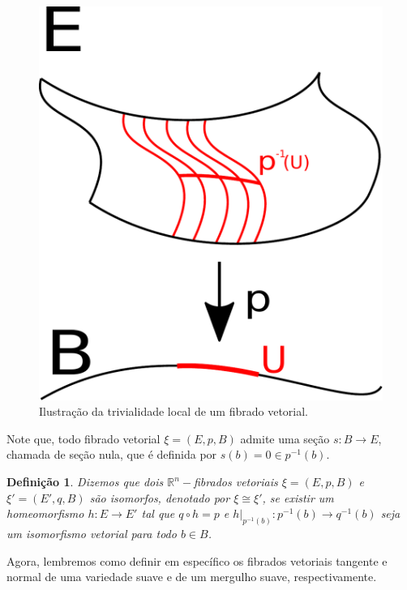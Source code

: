 \documentclass[12pt,oneside]{book} %
\newtheorem{defi}   {\hspace{0.5cm}Defini\c c\~ao}[chapter]
\newcommand{\R}{\mathbb{R}}
\begin{document}
\begin{figure}[h]
	\centering
	\includegraphics[scale=0.3]{fibrado.pdf}
	\caption{Ilustração da trivialidade local de um fibrado vetorial.}
\end{figure}

\par Note que, todo fibrado vetorial $\xi=(E,p,B)$ admite uma seção $s:B\to E$, chamada de seção nula, que é definida por $s(b)=0\in p^{-1}(b)$.

\begin{defi}\label{fv_iso}
	Dizemos que dois $\R^{n}-$fibrados vetoriais $\xi=(E,p,B)$ e $\xi'=(E',q,B)$ são isomorfos, denotado por $\xi\cong\xi'$, se existir um homeomorfismo $h:E\to E'$ tal que $q\circ h=p$ e $h|_{p^{-1}(b)}:p^{-1}(b)\to q^{-1}(b)$ seja um isomorfismo vetorial para todo $b\in B$.
\end{defi}

\par Agora, lembremos como definir em específico os fibrados vetoriais tangente e normal de uma variedade suave e de um mergulho suave, respectivamente.
\end{document}
